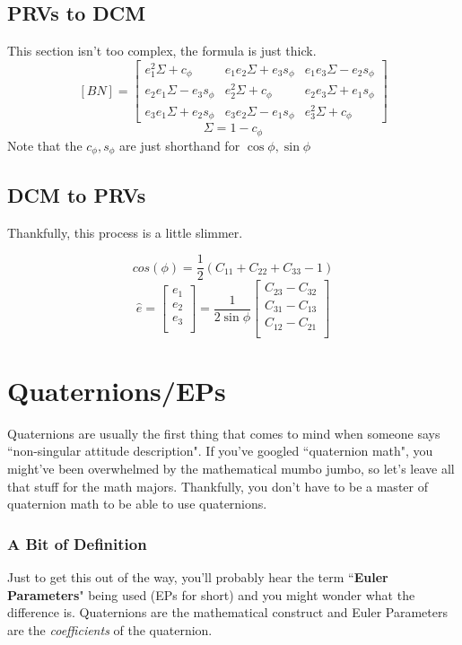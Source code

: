 \documentclass[a4paper,14pt]{extreport}
\begin{document}
\section{PRVs to DCM}
This section isn't too complex, the formula is just thick.
\[[BN] = \begin{bmatrix}
			e_1^2\Sigma+c_\phi&e_1 e_2 \Sigma + e_3 s_\phi&e_1 e_3 \Sigma - e_2 s_\phi\\
			e_2 e_1 \Sigma - e_3 s_\phi&e_2^2 \Sigma + c_\phi&e_2 e_3 \Sigma + e_1 s_\phi\\
			e_3 e_1 \Sigma + e_2 s_\phi&e_3 e_2 \Sigma - e_1 s_\phi&e_3^2 \Sigma + c_\phi
	\end{bmatrix}\]	
\[
\Sigma = 1-c_\phi
\]
Note that the $c_\phi,s_\phi$ are just shorthand for $\cos{\phi},\sin{\phi}$
\section{DCM to PRVs}
Thankfully, this process is a little slimmer.

\[
cos(\phi) = \dfrac{1}{2}(C_{11}+C_{22}+C_{33}-1)
\]
\[
\hat{e} = \begin{bmatrix}
e_1\\e_2\\e_3\\
\end{bmatrix} = \dfrac{1}{2\sin{\phi}}
\begin{bmatrix}
C_{23}-C_{32}\\C_{31}-C_{13}\\C_{12}-C_{21}\\
\end{bmatrix}
\]
\chapter{Quaternions/EPs}

Quaternions are usually the first thing that comes to mind when someone says ``non-singular attitude description". If you've googled ``quaternion math", you might've been overwhelmed by the mathematical mumbo jumbo, so let's leave all that stuff for the math majors. Thankfully, you don't have to be a master of quaternion math to be able to use quaternions.
\subsection{A Bit of Definition}
Just to get this out of the way, you'll probably hear the term ``\textbf{Euler Parameters}" being used (EPs for short) and you might wonder what the difference is. Quaternions are the mathematical construct and Euler Parameters are the \emph{coefficients} of the quaternion.\\
\end{document}
